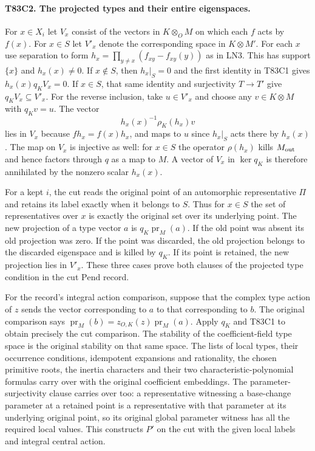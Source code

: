 \paragraph{T83C2. The projected types and their entire eigenspaces.}
For $x\in X_i$ let $V_x$ consist of the vectors in $K\otimes_O M$
on which each $f$ acts by $f(x)$. For $x\in S$ let $V'_x$ denote
the corresponding space in $K\otimes M'$. For each $x$ use
separation to form $h_x=\prod_{y\ne x}(f_{xy}-f_{xy}(y))$ as
in LN3. This has support $\{x\}$ and $h_x(x)\ne0$. If $x\notin S$,
then $h_x|_S=0$ and the first identity in T83C1 gives
$h_x(x)q_K V_x=0$. If $x\in S$, that same identity and
surjectivity $T\to T'$ give $q_K V_x\subseteq V'_x$.
For the reverse inclusion, take $u\in V'_x$ and choose any
$v\in K\otimes M$ with $q_Kv=u$. The vector
\[
               h_x(x)^{-1}\rho_K(h_x)v
\]
lies in $V_x$ because $fh_x=f(x)h_x$, and maps to $u$ since
$h_x|_S$ acts there by $h_x(x)$. The map on $V_x$ is injective
as well: for $x\in S$ the operator $\rho(h_x)$ kills
$M_{\rm out}$ and hence factors through $q$ as a map to $M$.
A vector of $V_x$ in $\ker q_K$ is therefore annihilated by
the nonzero scalar $h_x(x)$.

For a kept $i$, the cut reads the original point of an
automorphic representative $\Pi$ and retains its label exactly
when it belongs to $S$. Thus for $x\in S$ the set of representatives
over $x$ is exactly the original set over its underlying point.
The new projection of a type vector $a$ is
$q_K\operatorname{pr}_{M}(a)$. If the old point was absent its
old projection was zero. If the point was discarded, the old
projection belongs to the discarded eigenspace and is killed
by $q_K$. If its point is retained, the new projection lies in
$V'_x$. These three cases prove both clauses of the projected
type condition in the cut $\mathrm{Pend}$ record.

For the record's integral action comparison, suppose that the
complex type action of $z$ sends the vector corresponding to $a$
to that corresponding to $b$. The original comparison says
$\operatorname{pr}_M(b)=z_{O,K}(z)\operatorname{pr}_M(a)$.
Apply $q_K$ and T83C1 to obtain precisely the cut comparison.
The stability of the coefficient-field type space is the original
stability on that same space. The lists of local types, their
occurrence conditions, idempotent expansions and rationality,
the chosen primitive roots, the inertia characters and their two
characteristic-polynomial formulas carry over with the original
coefficient embeddings. The parameter-surjectivity clause carries
over too: a representative witnessing a base-change parameter at
a retained point is a representative with that parameter at its
underlying original point, so its original global parameter
witness has all the required local values. This constructs
$P'$ on the cut with the given local labels and integral
central action.

